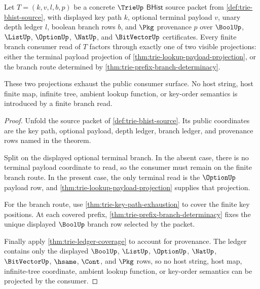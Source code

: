 \begin{theorem}\label{thm:trie-finite-branch-consumer-boundary}
Let $T=(k,v,l,b,p)$ be a concrete $\TrieUp$ $\mathsf{BHist}$ source packet
from \autoref{def:trie-bhist-source}, with displayed key path $k$, optional
terminal payload $v$, unary depth ledger $l$, boolean branch rows $b$, and
$\Pkg$ provenance $p$ over $\BoolUp$, $\ListUp$, $\OptionUp$, $\NatUp$, and
$\BitVectorUp$ certificates. Every finite branch consumer read of $T$ factors
through exactly one of two visible projections: either the terminal payload
projection of \autoref{thm:trie-lookup-payload-projection}, or the branch
route determined by \autoref{thm:trie-prefix-branch-determinacy}.

These two projections exhaust the public consumer surface. No host string,
host finite map, infinite tree, ambient lookup function, or key-order
semantics is introduced by a finite branch read.
\end{theorem}
\begin{proof}
Unfold the source packet of \autoref{def:trie-bhist-source}. Its public
coordinates are the key path, optional payload, depth ledger, branch ledger,
and provenance rows named in the theorem.

Split on the displayed optional terminal branch. In the absent case, there is
no terminal payload coordinate to read, so the consumer must remain on the
finite branch route. In the present case, the only terminal read is the
$\OptionUp$ payload row, and
\autoref{thm:trie-lookup-payload-projection} supplies that projection.

For the branch route, use \autoref{thm:trie-key-path-exhaustion} to cover the
finite key positions. At each covered prefix,
\autoref{thm:trie-prefix-branch-determinacy} fixes the unique displayed
$\BoolUp$ branch row selected by the packet.

Finally apply \autoref{thm:trie-ledger-coverage} to account for provenance.
The ledger contains only the displayed $\BoolUp$, $\ListUp$, $\OptionUp$,
$\NatUp$, $\BitVectorUp$, $\hsame$, $\Cont$, and $\Pkg$ rows, so no host
string, host map, infinite-tree coordinate, ambient lookup function, or
key-order semantics can be projected by the consumer.
\end{proof}

